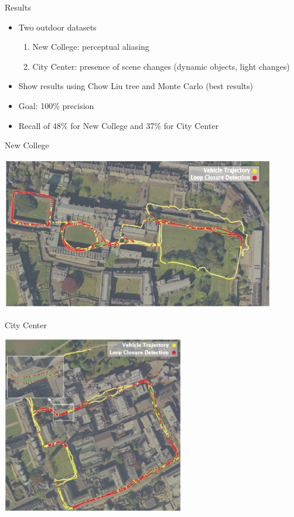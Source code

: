 \begin{frame}{Results}
    \begin{itemize}
        \item Two outdoor datasets
            \begin{enumerate}
                \item New College: perceptual aliasing
                \item City Center: presence of scene changes (dynamic objects, light changes)
            \end{enumerate}
        \item Show results using Chow Liu tree and Monte Carlo (best results)
        \item Goal: 100\% precision
        \item Recall of 48\% for New College and 37\% for City Center
    \end{itemize}
\end{frame}

\begin{frame}{New College}
    \begin{center}
        \includegraphics[width=0.9\textwidth]{./media/new_college.png}
    \end{center}
\end{frame}

\begin{frame}{City Center}
    \begin{center}
        \includegraphics[width=0.6\textwidth]{./media/city_center.png}
    \end{center}
\end{frame}

